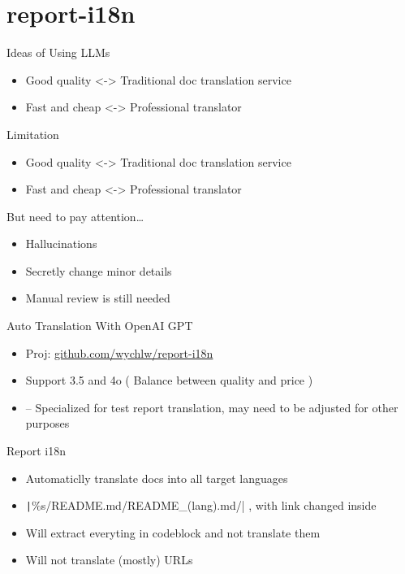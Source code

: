 \documentclass{beamer}
\begin{document}
\section{report-i18n}

\begin{frame}{Ideas of Using LLMs}
    \begin{itemize}
        \item Good quality <-> Traditional doc translation service
        \item Fast and cheap <-> Professional translator
    \end{itemize}
    \bigskip
    \bigskip
    \bigskip
    \bigskip
    \bigskip
\end{frame}

\begin{frame}{Limitation}
    \begin{itemize}
        \item Good quality <-> Traditional doc translation service
        \item Fast and cheap <-> Professional translator
    \end{itemize}
    \bigskip
    But need to pay attention\dots
    \begin{itemize}
        \item Hallucinations
        \item Secretly change minor details
        \item Manual review is still needed
    \end{itemize}
\end{frame}

\begin{frame}{Auto Translation With OpenAI GPT}
    \begin{itemize}
        \item Proj: \url{github.com/wychlw/report-i18n}
        \item Support 3.5 and 4o ( Balance between quality and price )
        \item -- Specialized for test report translation, may need to be adjusted for other purposes
    \end{itemize}
\end{frame}

\begin{frame}{Report i18n}
    \begin{itemize}
        \item Automaticlly translate docs into all target languages
        \item \texttt|\%s/README.md/README_(lang).md/| , with link changed inside
        \item Will extract everyting in codeblock and not translate them
        \item Will not translate (mostly) URLs
    \end{itemize}
\end{frame}
\end{document}

